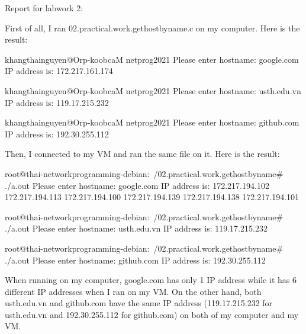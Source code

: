 Report for labwork 2:

First of all, I ran 02.practical.work.gethostbyname.c on my computer.
Here is the result:

khangthainguyen@Orp-koobcaM netprog2021 %
 Please enter hostname: 
google.com
IP address is: 
172.217.161.174

khangthainguyen@Orp-koobcaM netprog2021 %
 Please enter hostname: 
usth.edu.vn
IP address is: 
119.17.215.232

khangthainguyen@Orp-koobcaM netprog2021 %
 Please enter hostname: 
github.com
IP address is: 
192.30.255.112


Then, I connected to my VM and ran the same file on it. 
Here is the result:

root@thai-networkprogramming-debian:~/02.practical.work.gethostbyname# ./a.out
 Please enter hostname: 
google.com
IP address is: 
172.217.194.102
172.217.194.113
172.217.194.100
172.217.194.139
172.217.194.138
172.217.194.101

root@thai-networkprogramming-debian:~/02.practical.work.gethostbyname# ./a.out
 Please enter hostname: 
usth.edu.vn
IP address is: 
119.17.215.232

root@thai-networkprogramming-debian:~/02.practical.work.gethostbyname# ./a.out
 Please enter hostname: 
github.com
IP address is: 
192.30.255.112

When running on my computer, google.com has only 1 IP address while it has 6 different IP addresses when I ran on my VM.
On the other hand, both usth.edu.vn and github.com have the same IP address (119.17.215.232 for usth.edu.vn and 192.30.255.112
for github.com) on both of my computer and my VM.